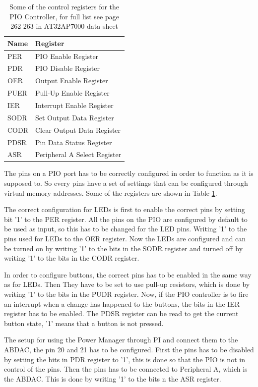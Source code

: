 \documentclass[12pt,a4paper,final]{report}
\numberwithin{equation}{section}
\numberwithin{table}{section}
\numberwithin{figure}{section}
\begin{document}
\begin{table}[H]
\centering
\begin{tabular}{|l|l|}
\hline
Name & Register\\
\hline
PER & PIO Enable Register\\
PDR & PIO Disable Register\\
OER & Output Enable Register\\
PUER & Pull-Up Enable Register\\
IER & Interrupt Enable Register\\
SODR & Set Output Data Register\\
CODR & Clear Output Data Register\\
PDSR & Pin Data Status Register\\
ASR & Peripheral A Select Register\\
\hline
\end{tabular}
\caption{Some of the control registers for the PIO Controller, for full list see page 262-263 in AT32AP7000 data sheet\cite{at32ap7000}}
\label{tab:pioregisters}
\end{table}

The pins on a PIO port has to be correctly configured in order to function as it is supposed to. So every pins have a set of settings that can be configured through virtual memory addresses. Some of the registers are shown in Table \ref{tab:pioregisters}.

The correct configuration for LEDs is first to enable the correct pins by setting bit '1' to the PER register. All the pins on the PIO are configured by default to be used as input, so this has to be changed for the LED pins. Writing '1' to the pins used for LEDs to the OER register. Now the LEDs are configured and can be turned on by writing '1' to the bits in the SODR register and turned off by writing '1' to the bits in the CODR register.

In order to configure buttons, the correct pins has to be enabled in the same way as for LEDs. Then They have to be set to use pull-up resistors, which is done by writing '1' to the bits in the PUDR register. Now, if the PIO controller is to fire an interrupt when a change has happened to the buttons, the bits in the IER register has to be enabled. The PDSR register can be read to get the current button state, '1' means that a button is not pressed.

The setup for using the Power Manager through PI and connect them to the ABDAC, the pin 20 and 21 has to be configured. First the pins has to be disabled by setting the bits in PDR register to '1', this is done so that the PIO is not in control of the pins. Then the pins has to be connected to Peripheral A, which is the ABDAC. This is done by writing '1' to the bits n the ASR register.
\end{document}
